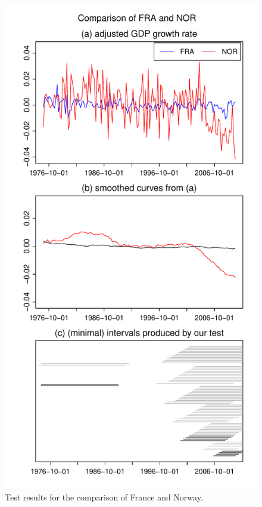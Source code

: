 \documentclass[a4paper,12pt]{article}
\begin{document}
\begin{figure}[t!]

\begin{minipage}[t]{0.49\textwidth}
\includegraphics[width=\textwidth]{Plots/FRA_vs_NOR}
\caption{Test results for the comparison of France and Norway.}\label{fig:France:Norway}
\end{minipage}

\end{figure}
\end{document}
